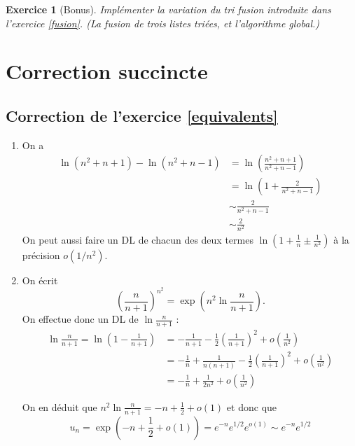 \documentclass[11pt,a4paper]{article}
\newtheorem{ex}{Exercice}
\begin{document}
\begin{ex}[Bonus]\label{bonus}
Implémenter la variation du tri fusion introduite dans l'exercice \ref{fusion}. (La fusion de trois listes triées, et l'algorithme global.)
\end{ex}

\newpage

\section*{Correction succincte}

\subsection*{Correction de l'exercice \ref{equivalents}}
\begin{enumerate}
\item On a
\begin{align*}
\ln(n^2+n+1)-\ln(n^2+n-1)
&= \ln\left(\frac{n^2+n+1}{n^2+n-1}\right)\\
&= \ln\left(1+\frac{2}{n^2+n-1}\right)\\
&\sim \frac{2}{n^2+n-1}\\
&\sim \frac{2}{n^2}
\end{align*}
On peut aussi faire un DL de chacun des deux termes $\ln\left(1+\frac1n\pm\frac{1}{n^2}\right)$ à la précision $o(1/n^2)$.
\item On écrit 
\[ \left(\frac{n}{n+1}\right)^{n^2}
= \exp \left(n^2 \ln \frac{n}{n+1}\right).
\]
On effectue donc un DL de $\ln \frac{n}{n+1}$ :
\begin{align*}
\ln \frac{n}{n+1}
= \ln\left(1-\frac{1}{n+1}\right) 
&= -\frac{1}{n+1} - \frac12\left(\frac{1}{n+1}\right)^2+o\left(\frac{1}{n^2}\right)\\
&= -\frac{1}{n} +\frac{1}{n(n+1)}- \frac12\left(\frac{1}{n+1}\right)^2+o\left(\frac{1}{n^2}\right)\\
&= -\frac{1}{n} + \frac{1}{2n^2}+o\left(\frac{1}{n^2}\right)
\end{align*}

On en déduit que $n^2 \ln \frac{n}{n+1} = -n+\frac12 + o(1)$ et donc que 
\[ u_n =\exp \left( -n+\frac12 + o(1)\right) 
= e^{-n}e^{1/2}e^{o(1)} 
\sim e^{-n}e^{1/2}
 \]
\end{enumerate}
\end{document}

